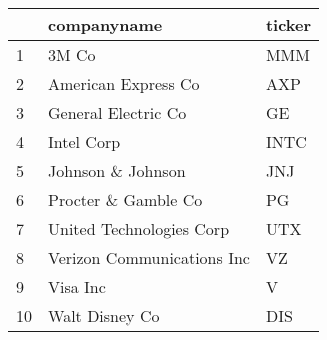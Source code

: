 \begin{tabular}{lll}
\toprule
 &                 companyname & ticker \\
\midrule
1  &                       3M Co &    MMM \\
2  &         American Express Co &    AXP \\
3 &         General Electric Co &     GE \\
4 &                  Intel Corp &   INTC \\
5 &           Johnson \& Johnson &    JNJ \\
6 &         Procter \& Gamble Co &     PG \\
7 &    United Technologies Corp &    UTX \\
8 &  Verizon Communications Inc &     VZ \\
9 &                    Visa Inc &      V \\
10 &              Walt Disney Co &    DIS \\
\bottomrule
\end{tabular}

